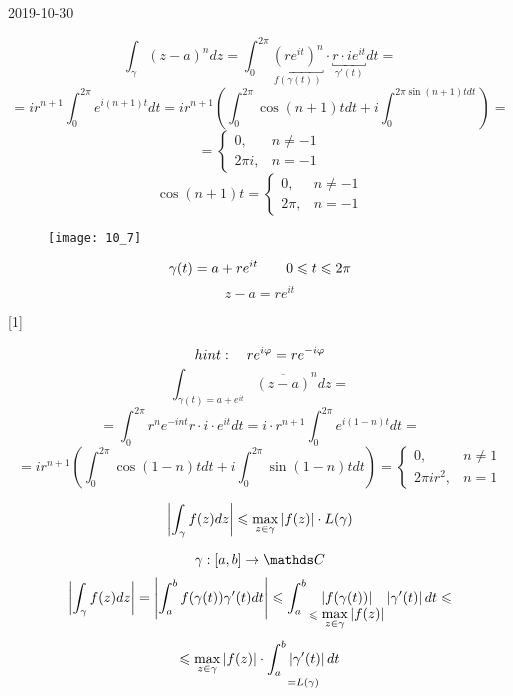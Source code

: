 \documentclass[main]{subfiles}
\begin{document}
\begin{lect}{2019-10-30}
     \begin{Example}[1]
         \[\int_\gamma (z - a)^n dz = \int_0^{2\pi} \underbracket{(re^{it} )^n
         }_{f(\gamma(t))} \cdot \underbracket{r \cdot ie^{it} }_{\gamma'(t)} dt = \]
         \[=ir^{n + 1} \int_0^{2\pi}e^{i(n + 1)t}dt = ir^{n + 1} (\int_0^{2\pi}
         \cos(n + 1)tdt + i\int_0^{2\pi \sin(n + 1)tdt} ) =   \]
         \[= \begin{cases}
             0,  & n \neq -1\\
             2\pi i, & n = -1
         \end{cases}\]
         \[\cos(n + 1)t = \begin{cases}
             0, & n \neq -1\\
             2\pi, & n = -1
         \end{cases}\]
         \begin{figure}[H]
 	        \centering
 	        \texttt{[image: 10\_7]}
 	      \end{figure}
         \[\gamma(t) = a + re^{it} \qquad 0 \leqslant t \leqslant 2\pi \]
         \[z - a = re^{it} \]
     \end{Example}[1]

     \begin{Example}[2]
         \[hint: \quad r e^{i\varphi} = r e^{-i \varphi}  \]
         \[\int_{\gamma(t) = a + e^{it} } \overline{(z - a)}^n dz =  \]
         \[=\int_0^{2\pi} r^n e^{-int} r \cdot i \cdot e^{it}dt =
         i \cdot r^{n + 1}  \int_0^{2\pi} e^{i(1 - n)t}dt =  \]
         \[=ir^{n + 1} \left(\int_0^{2\pi} \cos(1 - n)tdt + i\int_0^{2\pi}
         \sin(1 - n)tdt\right) = \begin{cases}
             0, & n \neq 1\\
             2\pi i r^2, & n = 1
         \end{cases}\]
     \end{Example}

     \begin{Utv}
         \[\left|\int_\gamma f(z)dz\right| \leqslant \max_{z \in \gamma} \left|f(z)\right| \cdot L(\gamma)\]
     \end{Utv}

     \begin{Proof}
         \[\gamma : [a, b] \to \CC\]
         \[\left|\int_\gamma f(z)dz\right| = \left|\int_a^b f(\gamma(t)) \gamma'(t)dt\right| \leqslant
         \int_a^b \underset{\leqslant \displaystyle \max_{z \in \gamma}
     \left|f(z)\right|}{\left|f(\gamma(t))\right| }\left|\gamma'(t)\right|dt \leqslant \]
     \[\leqslant \max_{z \in \gamma} \left|f(z)\right| \cdot \underset{= L(\gamma)}{\int_a^b \left|\gamma'(t)\right|dt }\]
     \end{Proof}


\end{lect}
\end{document}

